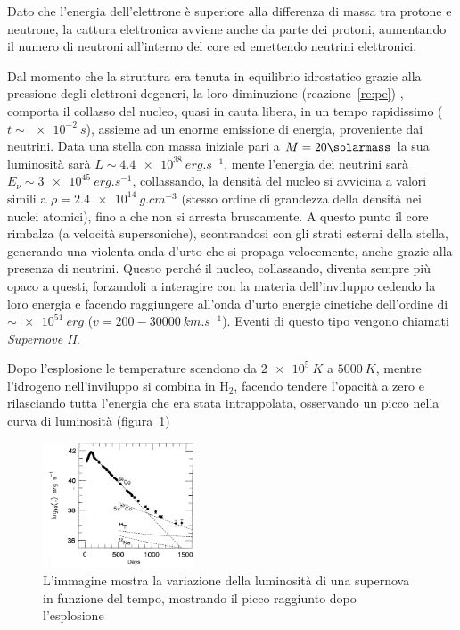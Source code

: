 Dato che l'energia dell'elettrone è superiore alla differenza di massa tra protone e neutrone, la cattura elettronica avviene anche da parte dei protoni, aumentando il numero di neutroni all'interno del core ed emettendo neutrini elettronici.

Dal momento che la struttura era tenuta in equilibrio idrostatico grazie alla pressione degli elettroni degeneri, la loro diminuzione (reazione~\ref{re:pe}) , comporta il collasso del nucleo, quasi in cauta libera, in un tempo rapidissimo ($t \sim \SI{e-2}{s}$), assieme ad un enorme emissione di energia, proveniente dai neutrini. Data una stella con massa iniziale pari a $M = 20\si{\solarmass}$ la sua luminosità sarà $L \sim \SI{4.4e38}{erg.s^{-1}}$, mente l'energia dei neutrini sarà $E_\nu \sim \SI{3e45}{erg.s^{-1}}$, collassando, la densità del nucleo si avvicina a valori simili a $\rho = \SI{2.4e14}{g.cm^{-3}}$ (stesso ordine di grandezza della densità nei nuclei atomici), fino a che non si arresta bruscamente. A questo punto il core rimbalza (a velocità supersoniche), scontrandosi con gli strati esterni della stella, generando una violenta onda d'urto che si propaga velocemente, anche grazie alla presenza di neutrini. Questo perché il nucleo, collassando, diventa sempre più opaco a questi, forzandoli a interagire con la materia dell'inviluppo cedendo la loro energia e facendo raggiungere all'onda d'urto energie cinetiche dell'ordine di $\sim \SI{e51}{erg}$ ($v = 200-\SI{30000}{km.s^{-1}}$). Eventi di questo tipo vengono chiamati \textit{Supernove II}.

Dopo l'esplosione le temperature scendono da $\SI{2e5}{K}$ a $\SI{5000}{K}$, mentre l'idrogeno nell'inviluppo si combina in $\mbox{H}_2$, facendo tendere l'opacità a zero e rilasciando tutta l'energia che era stata intrappolata, osservando un picco nella curva di luminosità (figura~\ref{fig:supernova})
\begin{figure}
    \centering
    \includegraphics[width = 0.4\textwidth]{immagini/supernova.png}
    \caption{L'immagine mostra la variazione della luminosità di una supernova in funzione del tempo, mostrando il picco raggiunto dopo l'esplosione}\label{fig:supernova}
\end{figure}

